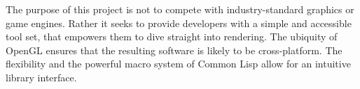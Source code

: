 The purpose of this project is not to compete with industry-standard graphics or game engines.
Rather it seeks to provide developers with a simple and accessible tool set,
that empowers them to dive straight into rendering.
The ubiquity of OpenGL ensures that the resulting software is likely to be cross-platform\cite{khronos}.
The flexibility and the powerful macro system of Common Lisp allow for an intuitive library interface\cite{practical_cl}.
